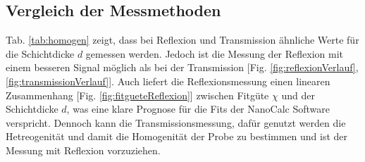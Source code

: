 \subsection{Vergleich der Messmethoden}
\label{sub:vergleich}

Tab. \ref{tab:homogen} zeigt, dass bei Reflexion und Transmission ähnliche Werte für die Schichtdicke $d$ gemessen werden. Jedoch ist die Messung der Reflexion mit einem besseren Signal möglich als bei der Transmission [Fig. \ref{fig:reflexionVerlauf}, \ref{fig:transmissionVerlauf}]. Auch liefert die Reflexionsmessung einen linearen Zusammenhang [Fig. \ref{fig:fitgueteReflexion}] zwischen Fitgüte $\chi$ und der Schichtdicke $d$, was eine klare Prognose für die Fits der NanoCalc Software verspricht. Dennoch kann die Transmissionsmessung, dafür genutzt werden die Hetreogenität und damit die Homogenität der Probe zu bestimmen und ist der Messung mit Reflexion vorzuziehen.